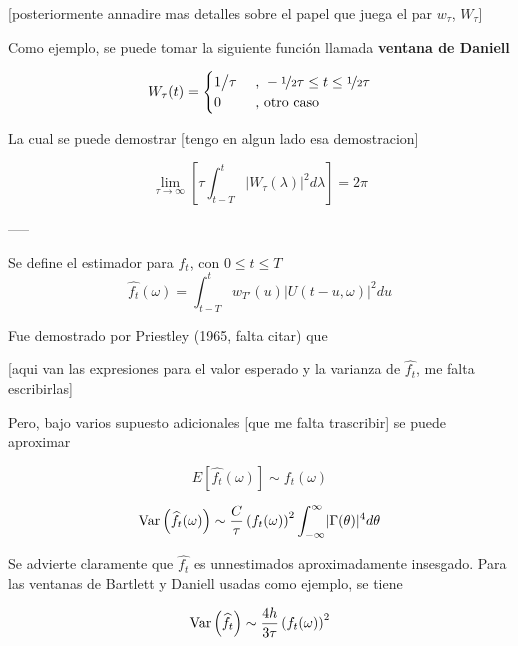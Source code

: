 
[posteriormente annadire mas detalles sobre el papel que juega el par $w_\tau$, $W_\tau$]

Como ejemplo, se puede tomar la siguiente funci\'on llamada \textbf{ventana de Daniell}

\begin{equation*}
W_\tau (t) = 
\begin{cases}
{1 \big{/} \tau} & \text{ , } -\nicefrac{1}{2} \tau \leq t \leq \nicefrac{1}{2} \tau
\\
0 & \text{ , otro caso}
\end{cases}
\end{equation*}

La cual se puede demostrar [tengo en algun lado esa demostracion]

$$\lim_{\tau\rightarrow\infty} \left[ \tau \int_{t-T}^{t} \lvert W_{\tau}(\lambda) \lvert^{2} d\lambda \right] = 2\pi$$

-----

Se define el estimador para $f_t$, con $0 \leq t \leq T$
\begin{equation*}
\widehat{f_t}(\omega) = \int_{t-T}^{t} w_{T'}(u) \lvert U(t-u,\omega) \lvert^{2} du
\end{equation*}

Fue demostrado por Priestley (1965, falta citar) que 

[aqui van las expresiones para el valor esperado y la varianza de $\widehat{f_t}$, me falta
escribirlas]

Pero, bajo varios supuesto adicionales [que me falta trascribir] se puede aproximar

\begin{equation*}
E\left[ \widehat{f_t}(\omega) \right] \sim f_t(\omega)
\end{equation*}

\begin{equation*}
\mathrm{Var}\left( \widehat{f_t}(\omega) \right) 
\sim 
\frac{C}{\tau} \left(f_t(\omega)\right)^{2} \int_{-\infty}^{\infty} \lvert \Gamma(\theta) \rvert^{4} d\theta
\end{equation*}

Se advierte claramente que $\widehat{f_t}$ es unnestimados aproximadamente insesgado.
Para las ventanas de Bartlett y Daniell usadas como ejemplo, se tiene

\begin{equation*}
\mathrm{Var}\left( \widehat{f_t} \right) 
\sim 
\frac{4h}{3\tau} \left(f_t(\omega)\right)^{2}
\end{equation*}

